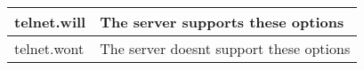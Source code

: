 \begin{table}[H]
{\begin{tabular}{|l|l|}
\hline
telnet.will                                                                     & The server supports these options                                                                                                                                                                                                                                                                                                                                           \\ 
\hline
telnet.wont                                                                     & The server doesnt support these options                                                                                                                                                                                                                                                                                                                                     \\
\hline
\end{tabular}}
\end{table}